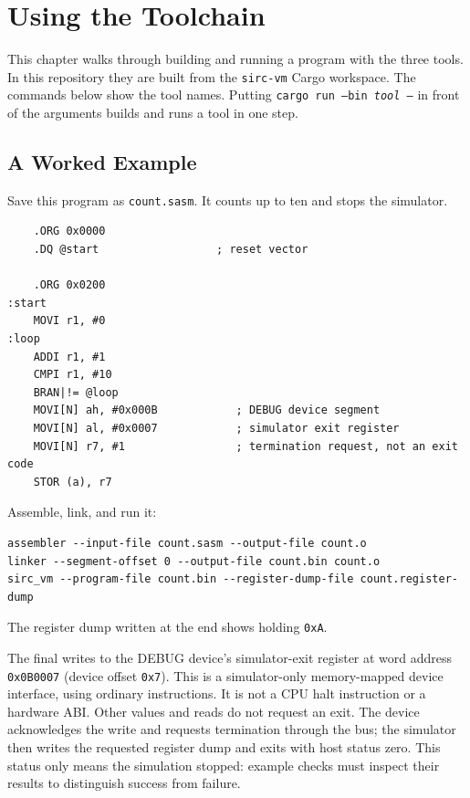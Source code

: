 \chapter{Using the Toolchain}
\label{ch:toolchain}

This chapter walks through building and running a program with the three tools. In this repository they are built from
the \texttt{sirc-vm} Cargo workspace. The commands below show the tool names. Putting \texttt{cargo run --bin
	\emph{tool} --} in front of the arguments builds and runs a tool in one step.

\section{A Worked Example}

Save this program as \texttt{count.sasm}. It counts  up to ten and stops the simulator.

\begin{lstlisting}
    .ORG 0x0000
    .DQ @start                  ; reset vector

    .ORG 0x0200
:start
    MOVI r1, #0
:loop
    ADDI r1, #1
    CMPI r1, #10
    BRAN|!= @loop
    MOVI[N] ah, #0x000B            ; DEBUG device segment
    MOVI[N] al, #0x0007            ; simulator exit register
    MOVI[N] r7, #1                 ; termination request, not an exit code
    STOR (a), r7
\end{lstlisting}

Assemble, link, and run it:

\begin{lstlisting}[language={}]
assembler --input-file count.sasm --output-file count.o
linker --segment-offset 0 --output-file count.bin count.o
sirc_vm --program-file count.bin --register-dump-file count.register-dump
\end{lstlisting}

The register dump written at the end shows  holding \texttt{0xA}.

The final  writes  to the DEBUG device's simulator-exit register at word address
\texttt{0x0B0007} (device offset \texttt{0x7}). This is a simulator-only memory-mapped device interface, using ordinary
instructions. It is not a CPU halt instruction or a hardware ABI. Other values and reads do not request an exit. The
device acknowledges the write and requests termination through the bus; the simulator then writes the requested
register dump and exits with host status zero. This status only means the simulation stopped: example checks must
inspect their results to distinguish success from failure.

